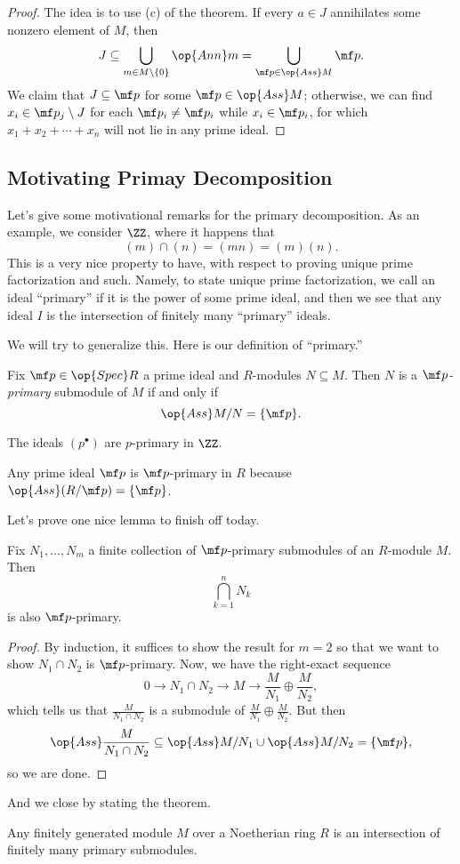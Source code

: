 \begin{proof}
	The idea is to use (c) of the theorem. If every $a\in J$ annihilates some nonzero element of $M$, then
	\[J\subseteq\bigcup_{m\in M\setminus\{0\}}\op{Ann}m=\bigcup_{\mf p\in\op{Ass}M}\mf p.\]
	We claim that $J\subseteq\mf p$ for some $\mf p\in\op{Ass}M$; otherwise, we can find $x_i\in\mf p_j\setminus J$ for each $\mf p_i\ne\mf p_i$ while $x_i\in\mf p_i$, for which $x_1+x_2+\cdots+x_n$ will not lie in any prime ideal.
\end{proof}

\subsection{Motivating Primay Decomposition}
Let's give some motivational remarks for the primary decomposition. As an example, we consider $\ZZ$, where it happens that
\[(m)\cap(n)=(mn)=(m)(n).\]
This is a very nice property to have, with respect to proving unique prime factorization and such. Namely, to state unique prime factorization, we call an ideal ``primary'' if it is the power of some prime ideal, and then we see that any ideal $I$ is the intersection of finitely many ``primary'' ideals.

We will try to generalize this. Here is our definition of ``primary.''
\begin{definition}
	Fix $\mf p\in\op{Spec}R$ a prime ideal and $R$-modules $N\subseteq M$. Then $N$ is a \textit{$\mf p$-primary} submodule of $M$ if and only if
	\[\op{Ass}M/N=\{\mf p\}.\]
\end{definition}
\begin{example}
	The ideals $\left(p^\bullet\right)$ are $p$-primary in $\ZZ$.
\end{example}
\begin{example}
	Any prime ideal $\mf p$ is $\mf p$-primary in $R$ because $\op{Ass}(R/\mf p)=\{\mf p\}$.
\end{example}
Let's prove one nice lemma to finish off today.
\begin{lemma}
	Fix $N_1,\ldots,N_m$ a finite collection of $\mf p$-primary submodules of an $R$-module $M$. Then
	\[\bigcap_{k=1}^nN_k\]
	is also $\mf p$-primary.
\end{lemma}
\begin{proof}
	By induction, it suffices to show the result for $m=2$ so that we want to show $N_1\cap N_2$ is $\mf p$-primary. Now, we have the right-exact sequence
	\[0\to N_1\cap N_2\to M\to\frac M{N_1}\oplus\frac M{N_2},\]
	which tells us that $\frac M{N_1\cap N_2}$ is a submodule of $\frac M{N_1}\oplus\frac M{N_2}$. But then
	\[\op{Ass}\frac M{N_1\cap N_2}\subseteq\op{Ass}M/N_1\cup\op{Ass}M/N_2=\{\mf p\},\]
	so we are done.
\end{proof}
And we close by stating the theorem.
\begin{theorem}
	Any finitely generated module $M$ over a Noetherian ring $R$ is an intersection of finitely many primary submodules.
\end{theorem}